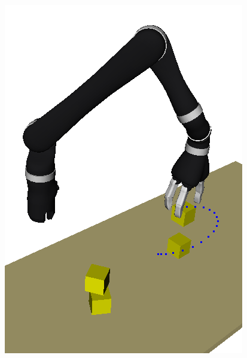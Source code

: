 \begin{frame}[fragile]
\begin{columns}
\begin{column}{0.4\textwidth}
    \includegraphics[width=\textwidth]{../thesis/img/openrave-blocks}
    \end{column}
  \end{columns}
\end{frame}

